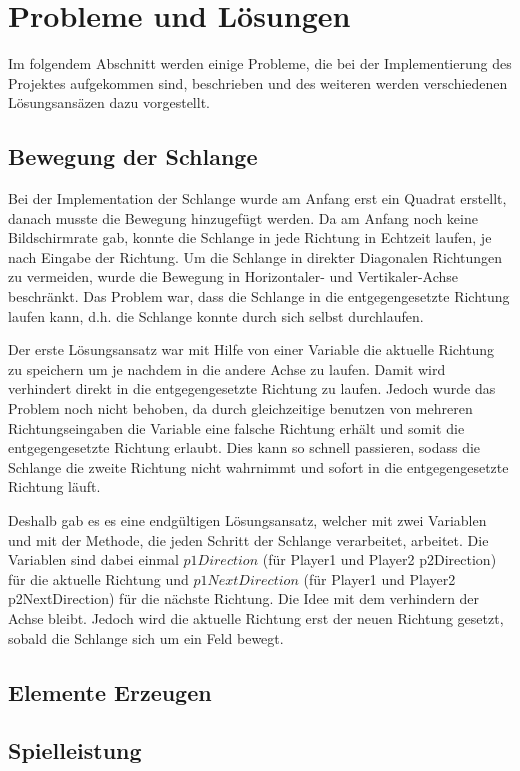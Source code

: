 
\chapter{Probleme und L{\"o}sungen}
\label{Probleme_und_Loesungen}
%
Im folgendem Abschnitt werden einige Probleme, die bei der Implementierung des Projektes aufgekommen sind, beschrieben und des weiteren werden verschiedenen L{\"o}sungsans{\"a}zen dazu vorgestellt.

\section{Bewegung der Schlange}
\label{Bewegung der Schlange}
%
Bei der Implementation der Schlange wurde am Anfang erst ein Quadrat erstellt, danach musste die Bewegung hinzugef{\"u}gt werden. Da am Anfang noch keine Bildschirmrate gab, konnte die Schlange in jede Richtung in Echtzeit laufen, je nach Eingabe der Richtung. Um die Schlange in direkter Diagonalen Richtungen zu vermeiden, wurde die Bewegung in Horizontaler- und Vertikaler-Achse beschr{\"a}nkt. Das Problem war, dass die Schlange in die entgegengesetzte Richtung laufen kann, d.h. die Schlange konnte durch sich selbst durchlaufen.

Der erste L{\"o}sungsansatz war mit Hilfe von einer Variable die aktuelle Richtung zu speichern um je nachdem in die andere Achse zu laufen. Damit wird verhindert direkt in die entgegengesetzte Richtung zu laufen. Jedoch wurde das Problem noch nicht behoben, da durch gleichzeitige benutzen von mehreren Richtungseingaben die Variable eine falsche Richtung erh{\"a}lt und somit die entgegengesetzte Richtung erlaubt. Dies kann so schnell passieren, sodass die Schlange die zweite Richtung nicht wahrnimmt und sofort in die entgegengesetzte Richtung l{\"a}uft.

Deshalb gab es es eine endg{\"u}ltigen L{\"o}sungsansatz, welcher mit zwei Variablen und mit der Methode, die jeden Schritt der Schlange verarbeitet, arbeitet. Die Variablen sind dabei einmal $p1Direction$ (f{\"u}r Player1 und Player2 p2Direction) f{\"u}r die aktuelle Richtung und $p1NextDirection$ (f{\"u}r Player1 und Player2 p2NextDirection) f{\"u}r die n{\"a}chste Richtung. Die Idee mit dem verhindern der Achse bleibt. Jedoch wird die aktuelle Richtung erst der neuen Richtung gesetzt, sobald die Schlange sich um ein Feld bewegt. 
%
\section{Elemente Erzeugen}
\label{Elemente Erzeugen}
%

%
\section{Spielleistung}
\label{Spielleistung}
%

%

